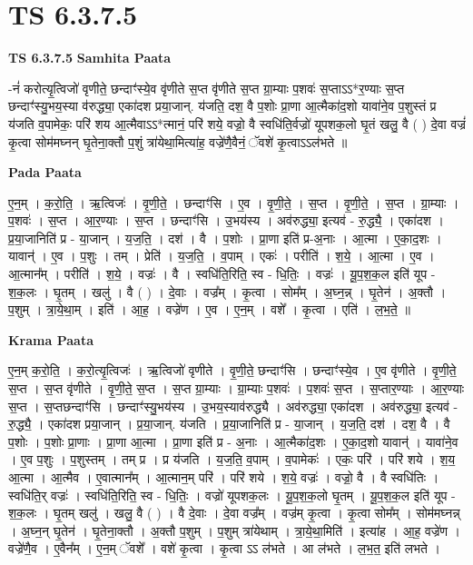 \documentclass[17pt]{extarticle}
\begin{document}
\section{ TS 6.3.7.5 }

\textbf{TS 6.3.7.5 } \newline
\textbf{Samhita Paata} \newline

-नं॑ करोत्यृ॒त्विजो॑ वृणीते॒ छन्दाꣳ॑स्ये॒व वृ॑णीते स॒प्त वृ॑णीते स॒प्त ग्रा॒म्याः प॒शवः॑ स॒प्ताऽऽ*र॒ण्याः स॒प्त छन्दाꣳ॑स्यु॒भय॒स्या व॑रुद्ध्या॒ एका॑दश प्रया॒जान्. य॑जति॒ दश॒ वै प॒शोः प्रा॒णा आ॒त्मैका॑द॒शो यावा॑ने॒व प॒शुस्तं प्र य॑जति व॒पामेकः॒ परि॑ शय आ॒त्मैवाऽऽ*त्मानं॒ परि॑ शये॒ वज्रो॒ वै स्वधि॑ति॒र्वज्रो॑ यूपशक॒लो घृ॒तं खलु॒ वै ( )  दे॒वा वज्रं॑ कृ॒त्वा सोम॑मघ्नन् घृ॒तेना॒क्तौ प॒शुं त्रा॑येथा॒मित्या॑ह॒ वज्रे॑णै॒वैनं॒ ॅवशे॑ कृ॒त्वाऽऽल॑भते ॥ \newline

\textbf{Pada Paata} \newline

ए॒न॒म् । क॒रो॒ति॒ । ऋ॒त्विजः॑ । वृ॒णी॒ते॒ । छन्दाꣳ॑सि । ए॒व । वृ॒णी॒ते॒ । स॒प्त । वृ॒णी॒ते॒ । स॒प्त । ग्रा॒म्याः । प॒शवः॑ । स॒प्त । आ॒र॒ण्याः । स॒प्त । छन्दाꣳ॑सि । उ॒भय॑स्य । अव॑रुद्ध्या॒ इत्यव॑ - रु॒द्ध्यै॒ । एका॑दश । प्र॒या॒जानिति॑ प्र - या॒जान् । य॒ज॒ति॒ । दश॑ । वै । प॒शोः । प्रा॒णा इति॑ प्र-अ॒नाः । आ॒त्मा । ए॒का॒द॒शः । यावान्॑ । ए॒व । प॒शुः । तम् । प्रेति॑ । य॒ज॒ति॒ । व॒पाम् । एकः॑ । परीति॑ । श॒ये॒ । आ॒त्मा । ए॒व । आ॒त्मान᳚म् । परीति॑ । श॒ये॒ । वज्रः॑ । वै । स्वधि॑ति॒रिति॒ स्व - धि॒तिः॒ । वज्रः॑ । यू॒प॒श॒क॒ल इति॑ यूप - श॒क॒लः । घृ॒तम् । खलु॑ । वै ( ) । दे॒वाः । वज्र᳚म् । कृ॒त्वा । सोम᳚म् । अ॒घ्न॒न्न् । घृ॒तेन॑ । अ॒क्तौ । प॒शुम् । त्रा॒ये॒था॒म् । इति॑ । आ॒ह॒ । वज्रे॑ण । ए॒व । ए॒न॒म् । वशे᳚ । कृ॒त्वा । एति॑ । ल॒भ॒ते॒ ॥  \newline


\textbf{Krama Paata} \newline

ए॒न॒म् क॒रो॒ति॒ । क॒रो॒त्यृ॒त्विजः॑ । ऋ॒त्विजो॑ वृणीते । वृ॒णी॒ते॒ छन्दाꣳ॑सि । छन्दाꣳ॑स्ये॒व । ए॒व वृ॑णीते । वृ॒णी॒ते॒ स॒प्त । स॒प्त वृ॑णीते । वृ॒णी॒ते॒ स॒प्त । स॒प्त ग्रा॒म्याः । ग्रा॒म्याः प॒शवः॑ । प॒शवः॑ स॒प्त । स॒प्तार॒ण्याः । आ॒र॒ण्याः स॒प्त । स॒प्तछन्दाꣳ॑सि । छन्दाꣳ॑स्यु॒भय॑स्य । उ॒भय॒स्याव॑रुद्ध्यै । अव॑रुद्ध्या॒ एका॑दश । अव॑रुद्ध्या॒ इत्यव॑ - रु॒द्ध्यै॒ । एका॑दश प्रया॒जान् । प्र॒या॒जान्. य॑जति । प्र॒या॒जानिति॑ प्र - या॒जान् । य॒ज॒ति॒ दश॑ । दश॒ वै । वै प॒शोः । प॒शोः प्रा॒णाः । प्रा॒णा आ॒त्मा । प्रा॒णा इति॑ प्र - अ॒नाः । आ॒त्मैका॑द॒शः । ए॒का॒द॒शो यावान्॑ । यावा॑ने॒व । ए॒व प॒शुः । प॒शुस्तम् । तम् प्र । प्र य॑जति । य॒ज॒ति॒ व॒पाम् । व॒पामेकः॑ । एकः॒ परि॑ । परि॑ शये । श॒य॒ आ॒त्मा । आ॒त्मैव । ए॒वात्मान᳚म् । आ॒त्मान॒म् परि॑ । परि॑ शये । श॒ये॒ वज्रः॑ । वज्रो॒ वै । वै स्वधि॑तिः । स्वधि॑ति॒र् वज्रः॑ । स्वधि॑ति॒रिति॒ स्व - धि॒तिः॒ । वज्रो॑ यूपशक॒लः । यू॒प॒श॒क॒लो घृ॒तम् । यू॒प॒श॒क॒ल इति॑ यूप - श॒क॒लः । घृ॒तम् खलु॑ । खलु॒ वै ( ) । वै दे॒वाः । दे॒वा वज्र᳚म् । वज्र॑म् कृ॒त्वा । कृ॒त्वा सोम᳚म् । सोम॑मघ्नन्न् । अ॒घ्न॒न् घृ॒तेन॑ । घृ॒तेना॒क्तौ । अ॒क्तौ प॒शुम् । प॒शुम् त्रा॑येथाम् । त्रा॒ये॒था॒मिति॑ । इत्या॑ह । आ॒ह॒ वज्रे॑ण । वज्रे॑णै॒व । ए॒वैन᳚म् । ए॒न॒म् ॅवशे᳚ । वशे॑ कृ॒त्वा । कृ॒त्वा ऽऽ ल॑भते । आ ल॑भते । ल॒भ॒त॒ इति॑ लभते । \newline
\end{document}
